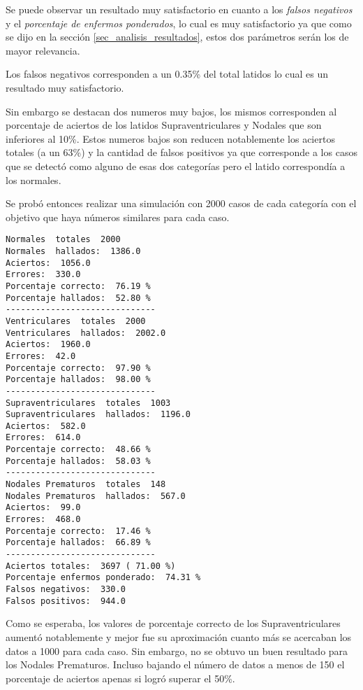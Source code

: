 \documentclass[conference]{IEEEtran}
\theoremstyle{definition}
\begin{document}
Se puede observar un resultado muy satisfactorio en cuanto a los \textit{falsos negativos} y el \textit{porcentaje de enfermos ponderados}, lo cual es muy satisfactorio ya que como se dijo en la secci\'{o}n \ref{sec_analisis_resultados}, estos dos par\'{a}metros ser\'{a}n los de mayor relevancia.

Los falsos negativos corresponden a un 0.35\% del total latidos lo cual es un resultado muy satisfactorio.

Sin embargo se destacan dos numeros muy bajos, los mismos corresponden al porcentaje de aciertos de los latidos Supraventriculares y Nodales que son inferiores al 10\%. Estos numeros bajos son reducen notablemente los aciertos totales (a un 63\%) y la cantidad de falsos positivos ya que corresponde a los casos que se detect\'{o} como alguno de esas dos categor\'{i}as pero el latido correspond\'{i}a a los normales.

Se prob\'{o} entonces realizar una simulaci\'{o}n con 2000 casos de cada categor\'{i}a con el objetivo que haya n\'{u}meros similares para cada caso.

\begin{lstlisting}[frame=single]
Normales  totales  2000
Normales  hallados:  1386.0
Aciertos:  1056.0
Errores:  330.0
Porcentaje correcto:  76.19 %
Porcentaje hallados:  52.80 %
------------------------------
Ventriculares  totales  2000
Ventriculares  hallados:  2002.0
Aciertos:  1960.0
Errores:  42.0
Porcentaje correcto:  97.90 %
Porcentaje hallados:  98.00 %
------------------------------
Supraventriculares  totales  1003
Supraventriculares  hallados:  1196.0
Aciertos:  582.0
Errores:  614.0
Porcentaje correcto:  48.66 %
Porcentaje hallados:  58.03 %
------------------------------
Nodales Prematuros  totales  148
Nodales Prematuros  hallados:  567.0
Aciertos:  99.0
Errores:  468.0
Porcentaje correcto:  17.46 %
Porcentaje hallados:  66.89 %
------------------------------
Aciertos totales:  3697 ( 71.00 %)
Porcentaje enfermos ponderado:  74.31 %
Falsos negativos:  330.0
Falsos positivos:  944.0
\end{lstlisting}

Como se esperaba, los valores de porcentaje correcto de los Supraventriculares aument\'{o} notablemente y mejor fue su aproximaci\'{o}n cuanto m\'{a}s se acercaban los datos a 1000 para cada caso. Sin embargo, no se obtuvo un buen resultado para los Nodales Prematuros. Incluso bajando el n\'{u}mero de datos a menos de 150 el porcentaje de aciertos apenas si logr\'{o} superar el 50\%.
\end{document}
